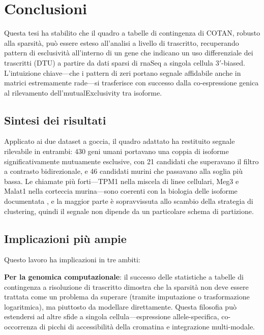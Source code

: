 \chapter{Conclusioni}

Questa tesi ha stabilito che il quadro a tabelle di contingenza di COTAN, robusto alla sparsità, può essere esteso all'analisi a livello di trascritto, recuperando pattern di esclusività all'interno di un gene che indicano un uso differenziale dei trascritti (DTU) a partire da dati sparsi di \gls{rnaSeq} a singola cellula $3'$-biased. L'intuizione chiave---che i pattern di zeri portano segnale affidabile anche in matrici estremamente rade---si trasferisce con successo dalla co-espressione genica al rilevamento dell'\gls{mutualExclusivity} tra isoforme.

\section{Sintesi dei risultati}

Applicato ai due dataset a goccia, il quadro adattato ha restituito segnale rilevabile in entrambi: 430 geni umani portavano una coppia di isoforme significativamente mutuamente esclusive, con 21 candidati che superavano il filtro a contrasto bidirezionale, e 46 candidati murini che passavano alla soglia più bassa. Le chiamate più forti---TPM1 nella miscela di linee cellulari, Meg3 e Malat1 nella corteccia murina---sono coerenti con la biologia delle isoforme documentata \cite{ghanam2023malat1, xue2012specialized}, e la maggior parte è sopravvissuta allo scambio della strategia di clustering, quindi il segnale non dipende da un particolare schema di partizione.

\section{Implicazioni più ampie}

Questo lavoro ha implicazioni in tre ambiti:

\textbf{Per la genomica computazionale}: il successo delle statistiche a tabelle di contingenza a risoluzione di trascritto dimostra che la sparsità non deve essere trattata come un problema da superare (tramite imputazione o trasformazione logaritmica), ma piuttosto da modellare direttamente. Questa filosofia può estendersi ad altre sfide a singola cellula---espressione allele-specifica, co-occorrenza di picchi di accessibilità della cromatina e integrazione multi-modale.

